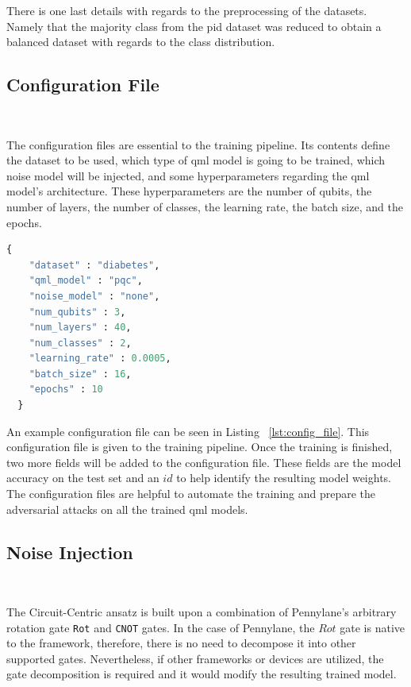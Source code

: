 There is one last details with regards to the preprocessing
of the datasets. Namely that the majority class from the
\ac{pid} dataset was reduced to obtain a balanced dataset
with regards to the class distribution. \

\subsection{Configuration File}\label{subsection:config} \

The configuration files are essential to the training
pipeline. Its contents define the dataset to be used,
which type of \ac{qml} model is going to be trained,
which noise model will be injected, and some hyperparameters
regarding the \ac{qml} model's architecture. These hyperparameters
are the number of qubits, the number of layers, the number of
classes, the learning rate, the batch size, and the epochs. \

\begin{lstlisting}[language=Python, caption={Example configuration file.}, label=lst:config_file]
  {
    "dataset" : "diabetes",
    "qml_model" : "pqc",
    "noise_model" : "none",
    "num_qubits" : 3,
    "num_layers" : 40,
    "num_classes" : 2,
    "learning_rate" : 0.0005,
    "batch_size" : 16,
    "epochs" : 10
  }
\end{lstlisting}

An example configuration file can be seen in Listing
~\ref{lst:config_file}. This configuration file is given
to the training pipeline. Once the training is finished,
two more fields will be added to the configuration file.
These fields are the model accuracy on the test set and an
\(id\) to help identify the resulting model weights. The
configuration files are helpful to automate the training
and prepare the adversarial attacks on all the trained
\ac{qml} models. \

\subsection{Noise Injection}\label{subsection:noise_injection} \

The Circuit-Centric ansatz is built upon a combination of 
Pennylane's arbitrary rotation gate \colorbox{inline_gray}{\lstinline|Rot|}
and \colorbox{inline_gray}{\lstinline|CNOT|} gates. In the case
of Pennylane, the \(Rot\) gate is native to the framework, therefore,
there is no need to decompose it into other supported gates.
Nevertheless, if other frameworks or devices are utilized,
the gate decomposition is required and it would modify the resulting
trained model. \

